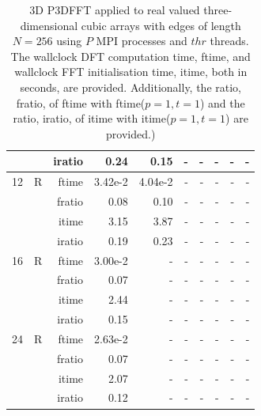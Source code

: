 \documentclass[a4paper]{article}
\begin{document}
\begin{table}[htbp]
\begin{center}
\begin{small}
\begin{tabular}{|r|r|r|r|r|r|r|r|r|r|}
             &             &  iratio &    0.24 &    0.15 &      - &      - &      - &      - &      - \\\hline
   12 &   R &   ftime &    3.42e-2 &    4.04e-2 &      - &      - &      - &      - &      - \\
             &             &  fratio &    0.08 &   0.10 &      - &      - &      - &      - &      - \\
             &             &  itime &    3.15  &    3.87  &      - &      - &      - &      - &      - \\
             &             &  iratio &   0.19 &    0.23 &      - &      - &      - &      - &      - \\\hline
   16 &   R &   ftime &    3.00e-2 &      - &      - &      - &      - &      - &      - \\
             &             &  fratio &    0.07 &     - &      - &      - &      - &      - &      - \\
             &             &  itime &    2.44  &      - &      - &      - &      - &      - &      - \\
             &             &  iratio &    0.15 &      - &      - &      - &      - &      - &      - \\\hline
   24 &   R &   ftime &    2.63e-2 &      - &      - &      - &      - &      - &      - \\
             &             &  fratio &    0.07 &     - &      - &      - &      - &      - &      - \\
             &             &  itime &    2.07  &      - &      - &      - &      - &      - &      - \\
             &             &  iratio &    0.12 &      - &      - &      - &      - &      - &      - \\\hline


\end{tabular}
\caption{3D P3DFFT applied to real valued three-dimensional cubic arrays with edges of length $N=256$ using $P$ MPI processes and $thr$ threads. The wallclock DFT computation time, ftime, and wallclock FFT initialisation time, itime, both in seconds, are provided. Additionally, the ratio, fratio, of ftime  with ftime($p=1,t=1$) and the ratio, iratio, of itime  with itime($p=1,t=1$) are provided.) }\label{Tbl:P3DFFT3d256}
\end{small}
\end{center}
\end{table}
\end{document}
